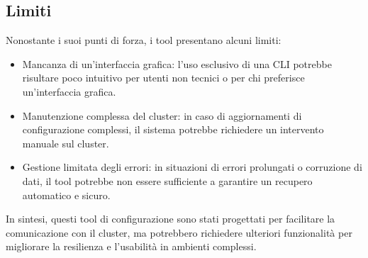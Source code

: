 \subsection{Limiti}
Nonostante i suoi punti di forza, i tool presentano alcuni limiti:
\begin{itemize}
  \item Mancanza di un'interfaccia grafica: l'uso esclusivo di una CLI potrebbe risultare poco intuitivo per utenti non tecnici o per chi preferisce un'interfaccia grafica.
  \item Manutenzione complessa del cluster: in caso di aggiornamenti di configurazione complessi, il sistema potrebbe richiedere un intervento manuale sul cluster.
  \item Gestione limitata degli errori: in situazioni di errori prolungati o corruzione di dati, il tool potrebbe non essere sufficiente a garantire un recupero automatico e sicuro.
\end{itemize}
In sintesi, questi tool di configurazione sono stati progettati per facilitare la comunicazione con il cluster, ma potrebbero richiedere ulteriori funzionalità per migliorare la resilienza e l'usabilità in ambienti complessi.
